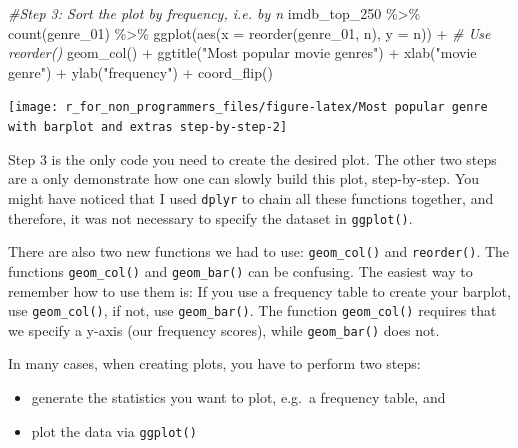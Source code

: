 \documentclass[
]{book}
\newenvironment{Shaded}{\begin{snugshade}}{\end{snugshade}}
\newcommand{\AttributeTok}[1]{\textcolor[rgb]{0.77,0.63,0.00}{#1}}
\newcommand{\CommentTok}[1]{\textcolor[rgb]{0.56,0.35,0.01}{\textit{#1}}}
\newcommand{\FunctionTok}[1]{\textcolor[rgb]{0.00,0.00,0.00}{#1}}
\newcommand{\NormalTok}[1]{#1}
\newcommand{\SpecialCharTok}[1]{\textcolor[rgb]{0.00,0.00,0.00}{#1}}
\newcommand{\StringTok}[1]{\textcolor[rgb]{0.31,0.60,0.02}{#1}}
\begin{document}
\begin{Shaded}
\begin{Highlighting}[]
\CommentTok{\#Step 3: Sort the plot by frequency, i.e. by \textquotesingle{}n\textquotesingle{}}
\NormalTok{imdb\_top\_250 }\SpecialCharTok{\%\textgreater{}\%} 
  \FunctionTok{count}\NormalTok{(genre\_01) }\SpecialCharTok{\%\textgreater{}\%} 
  \FunctionTok{ggplot}\NormalTok{(}\FunctionTok{aes}\NormalTok{(}\AttributeTok{x =} \FunctionTok{reorder}\NormalTok{(genre\_01, n), }\AttributeTok{y =}\NormalTok{ n)) }\SpecialCharTok{+}    \CommentTok{\# Use \textquotesingle{}reorder()\textquotesingle{}}
  \FunctionTok{geom\_col}\NormalTok{() }\SpecialCharTok{+}
  \FunctionTok{ggtitle}\NormalTok{(}\StringTok{"Most popular movie genres"}\NormalTok{) }\SpecialCharTok{+}
  \FunctionTok{xlab}\NormalTok{(}\StringTok{"movie genre"}\NormalTok{) }\SpecialCharTok{+}
  \FunctionTok{ylab}\NormalTok{(}\StringTok{"frequency"}\NormalTok{) }\SpecialCharTok{+}
  \FunctionTok{coord\_flip}\NormalTok{()}
\end{Highlighting}
\end{Shaded}

\begin{center}\texttt{[image: r\_for\_non\_programmers\_files/figure-latex/Most popular genre with barplot and extras step-by-step-2]} \end{center}

Step 3 is the only code you need to create the desired plot. The other two steps are a only demonstrate how one can slowly build this plot, step-by-step. You might have noticed that I used \texttt{dplyr} to chain all these functions together, and therefore, it was not necessary to specify the dataset in \texttt{ggplot()}.

There are also two new functions we had to use: \texttt{geom\_col()} and \texttt{reorder()}. The functions \texttt{geom\_col()} and \texttt{geom\_bar()} can be confusing. The easiest way to remember how to use them is: If you use a frequency table to create your barplot, use \texttt{geom\_col()}, if not, use \texttt{geom\_bar()}. The function \texttt{geom\_col()} requires that we specify a y-axis (our frequency scores), while \texttt{geom\_bar()} does not.

In many cases, when creating plots, you have to perform two steps:

\begin{itemize}
\item
  generate the statistics you want to plot, e.g.~a frequency table, and
\item
  plot the data via \texttt{ggplot()}
\end{itemize}
\end{document}
